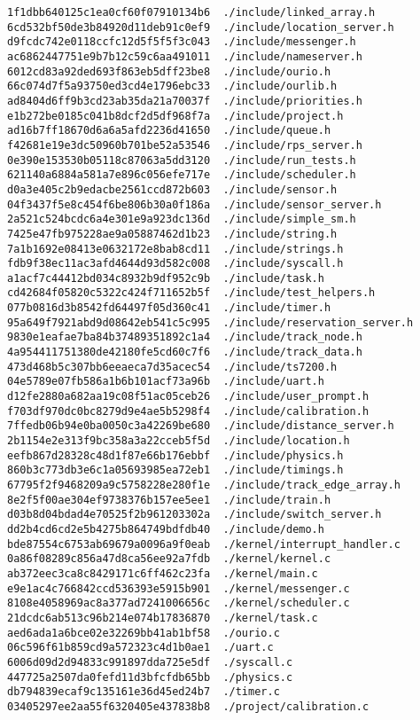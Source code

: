 \documentclass[letterpaper]{article}
\begin{document}
\begin{verbatim}
1f1dbb640125c1ea0cf60f07910134b6  ./include/linked_array.h
6cd532bf50de3b84920d11deb91c0ef9  ./include/location_server.h
d9fcdc742e0118ccfc12d5f5f5f3c043  ./include/messenger.h
ac6862447751e9b7b12c59c6aa491011  ./include/nameserver.h
6012cd83a92ded693f863eb5dff23be8  ./include/ourio.h
66c074d7f5a93750ed3cd4e1796ebc33  ./include/ourlib.h
ad8404d6ff9b3cd23ab35da21a70037f  ./include/priorities.h
e1b272be0185c041b8dcf2d5df968f7a  ./include/project.h
ad16b7ff18670d6a6a5afd2236d41650  ./include/queue.h
f42681e19e3dc50960b701be52a53546  ./include/rps_server.h
0e390e153530b05118c87063a5dd3120  ./include/run_tests.h
621140a6884a581a7e896c056efe717e  ./include/scheduler.h
d0a3e405c2b9edacbe2561ccd872b603  ./include/sensor.h
04f3437f5e8c454f6be806b30a0f186a  ./include/sensor_server.h
2a521c524bcdc6a4e301e9a923dc136d  ./include/simple_sm.h
7425e47fb975228ae9a05887462d1b23  ./include/string.h
7a1b1692e08413e0632172e8bab8cd11  ./include/strings.h
fdb9f38ec11ac3afd4644d93d582c008  ./include/syscall.h
a1acf7c44412bd034c8932b9df952c9b  ./include/task.h
cd42684f05820c5322c424f711652b5f  ./include/test_helpers.h
077b0816d3b8542fd64497f05d360c41  ./include/timer.h
95a649f7921abd9d08642eb541c5c995  ./include/reservation_server.h
9830e1eafae7ba84b37489351892c1a4  ./include/track_node.h
4a954411751380de42180fe5cd60c7f6  ./include/track_data.h
473d468b5c307bb6eeaeca7d35acec54  ./include/ts7200.h
04e5789e07fb586a1b6b101acf73a96b  ./include/uart.h
d12fe2880a682aa19c08f51ac05ceb26  ./include/user_prompt.h
f703df970dc0bc8279d9e4ae5b5298f4  ./include/calibration.h
7ffedb06b94e0ba0050c3a42269be680  ./include/distance_server.h
2b1154e2e313f9bc358a3a22cceb5f5d  ./include/location.h
eefb867d28328c48d1f87e66b176ebbf  ./include/physics.h
860b3c773db3e6c1a05693985ea72eb1  ./include/timings.h
67795f2f9468209a9c5758228e280f1e  ./include/track_edge_array.h
8e2f5f00ae304ef9738376b157ee5ee1  ./include/train.h
d03b8d04bdad4e70525f2b961203302a  ./include/switch_server.h
dd2b4cd6cd2e5b4275b864749bdfdb40  ./include/demo.h
bde87554c6753ab69679a0096a9f0eab  ./kernel/interrupt_handler.c
0a86f08289c856a47d8ca56ee92a7fdb  ./kernel/kernel.c
ab372eec3ca8c8429171c6ff462c23fa  ./kernel/main.c
e9e1ac4c766842ccd536393e5915b901  ./kernel/messenger.c
8108e4058969ac8a377ad7241006656c  ./kernel/scheduler.c
21dcdc6ab513c96b214e074b17836870  ./kernel/task.c
aed6ada1a6bce02e32269bb41ab1bf58  ./ourio.c
06c596f61b859cd9a572323c4d1b0ae1  ./uart.c
6006d09d2d94833c991897dda725e5df  ./syscall.c
447725a2507da0fefd11d3bfcfdb65bb  ./physics.c
db794839ecaf9c135161e36d45ed24b7  ./timer.c
03405297ee2aa55f6320405e437838b8  ./project/calibration.c

\end{verbatim}
\end{document}
